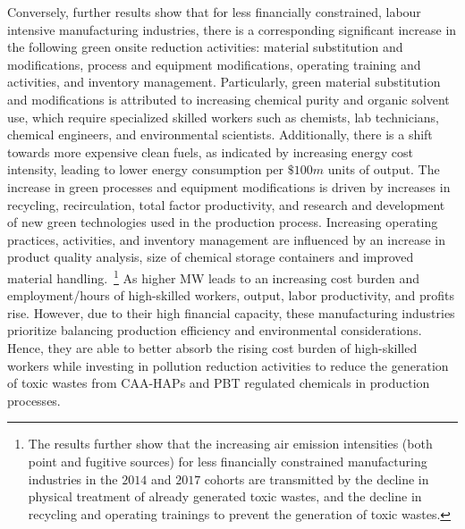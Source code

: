 \documentclass[12pt, english]{article}
\begin{document}
    Conversely, further results show that for less financially constrained, labour intensive manufacturing industries, there is a corresponding significant increase in the following green onsite reduction activities: material substitution and modifications, process and equipment modifications, operating training and activities, and inventory management. Particularly, green material substitution and modifications is attributed to increasing chemical purity and organic solvent use, which require specialized skilled workers such as chemists, lab technicians, chemical engineers, and environmental scientists. Additionally, there is a shift towards more expensive clean fuels, as indicated by increasing energy cost intensity, leading to lower energy consumption per $\$100m$ units of output. The increase in green processes and equipment modifications is driven by increases in recycling, recirculation, total factor productivity, and research and development of new green technologies used in the production process. Increasing operating practices, activities, and inventory management are influenced by an increase in product quality analysis, size of chemical storage containers and improved material handling.~\footnote{\tiny The results further show that the increasing air emission intensities (both point and fugitive sources) for less financially constrained manufacturing industries in the $2014$ and $2017$ cohorts are transmitted by the decline in physical treatment of already generated toxic wastes, and the decline in recycling and operating trainings to prevent the generation of toxic wastes.} As higher MW leads to an increasing cost burden and employment/hours of high-skilled workers, output, labor productivity, and profits rise. However, due to their high financial capacity, these manufacturing industries prioritize balancing production efficiency and environmental considerations. Hence, they are able to better absorb the rising cost burden of high-skilled workers while investing in pollution reduction activities to reduce the generation of toxic wastes from CAA-HAPs and PBT regulated chemicals in production processes.



    
    
\end{document}
